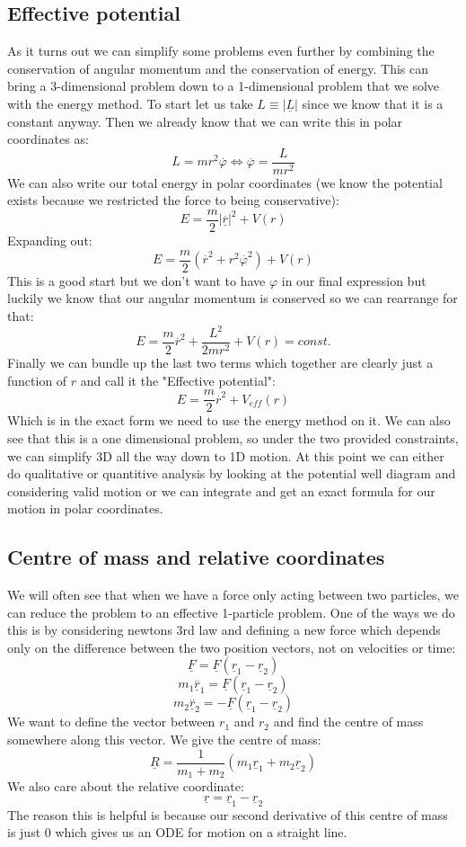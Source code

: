 \documentclass[12pt]{article}
\begin{document}
\subsection*{Effective potential}
As it turns out we can simplify some problems even further by combining the conservation of angular momentum and the conservation of energy. This can bring a 3-dimensional problem down to a 1-dimensional problem that we solve with the energy method. To start let us take \(L\equiv\vert \underline{L}\vert\) since we know that it is a constant anyway. Then we already know that we can write this in polar coordinates as:
\[L=mr^2\overset{.}{\varphi}\iff\overset{.}{\varphi}=\frac{L}{mr^2}\]
We can also write our total energy in polar coordinates (we know the potential exists because we restricted the force to being conservative):
\[E=\frac{m}{2}\vert\underline{\overset{.}{r}}\vert^2 + V(r)\]
Expanding out:
\[E=\frac{m}{2}\left(\overset{.}{r}^2+r^2\overset{.}{\varphi}^2\right)+V(r)\]
This is a good start but we don't want to have \(\varphi\) in our final expression but luckily we know that our angular momentum is conserved so we can rearrange for that:
\[E=\frac{m}{2}\overset{.}{r}^2+\frac{L^2}{2mr^2}+V(r)= const.\]
Finally we can bundle up the last two terms which together are clearly just a function of \(r\) and call it the "Effective potential":
\[E=\frac{m}{2}\overset{.}{r}^2+V_{eff}(r)\]
Which is in the exact form we need to use the energy method on it. We can also see that this is a one dimensional problem, so under the two provided constraints, we can simplify 3D all the way down to 1D motion. At this point we can either do qualitative or quantitive analysis by looking at the potential well diagram and considering valid motion or we can integrate and get an exact formula for our motion in polar coordinates.
\subsection*{Centre of mass and relative coordinates}
We will often see that when we have a force only acting between two particles, we can reduce the problem to an effective 1-particle problem. One of the ways we do this is by considering newtons 3rd law and defining a new force which depends only on the difference between the two position vectors, not on velocities or time:
\[\underline{F}=\underline{F}(\underline{r}_1-\underline{r}_2)\]
\[m_1\overset{..}{\underline{r}}_1=\underline{F}(\underline{r}_1-\underline{r}_2)\]
\[m_2\overset{..}{\underline{r}}_2=-\underline{F}(\underline{r}_1-\underline{r}_2)\]
We want to define the vector between \(r_1\) and \(r_2\) and find the centre of mass somewhere along this vector. We give the centre of mass:
\[\underline{R}=\frac{1}{m_1+m_2}(m_1\underline{r}_1+m_2\underline{r}_2)\]
We also care about the relative coordinate:
\[\underline{r}=\underline{r}_1-\underline{r}_2\]
The reason this is helpful is because our second derivative of this centre of mass is just \(0\) which gives us an ODE for motion on a straight line.
\end{document}
